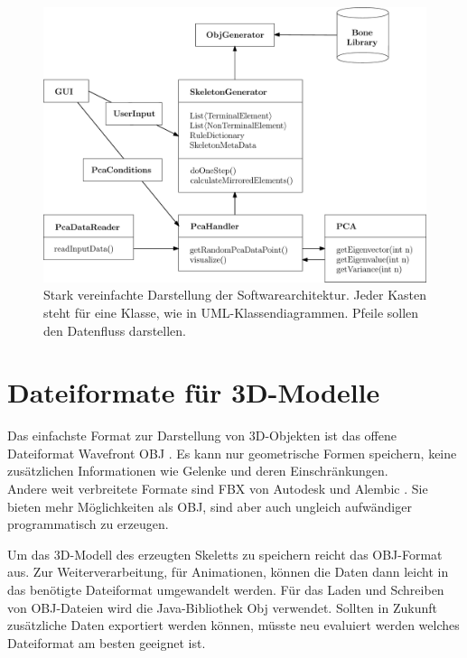 \begin{figure}
 \includegraphics[width=\textwidth]{graphics/classDiagram}
 \caption{Stark vereinfachte Darstellung der Softwarearchitektur. Jeder Kasten steht für eine Klasse, wie in UML-Klassendiagrammen. Pfeile sollen den Datenfluss darstellen.}
 \label{classDiagram}
\end{figure}


\section{Dateiformate für 3D-Modelle}

Das einfachste Format zur Darstellung von 3D-Objekten ist das offene Dateiformat Wavefront OBJ \cite{obj}. Es kann nur geometrische Formen speichern, keine zusätzlichen Informationen wie \zb Gelenke und deren Einschränkungen.\\
Andere weit verbreitete Formate sind FBX von Autodesk \cite{fbx} und Alembic \cite{alembic}. Sie bieten mehr Möglichkeiten als OBJ, sind aber auch ungleich aufwändiger programmatisch zu erzeugen.

Um das 3D-Modell des erzeugten Skeletts zu speichern reicht das OBJ-Format aus. Zur Weiterverarbeitung, \zb für Animationen, können die Daten dann leicht in das benötigte Dateiformat umgewandelt werden. Für das Laden und Schreiben von OBJ-Dateien wird die Java-Bibliothek Obj \cite{ObjLoader} verwendet.
Sollten in Zukunft zusätzliche Daten exportiert werden können, müsste neu evaluiert werden welches Dateiformat am besten geeignet ist.




